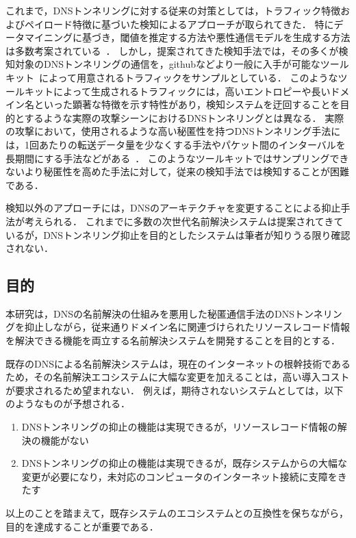 これまで，DNSトンネリングに対する従来の対策としては，トラフィック特徴およびペイロード特徴に基づいた検知によるアプローチが取られてきた．
特にデータマイニングに基づき，閾値を推定する方法や悪性通信モデルを生成する方法は多数考案されている~\cite{born, cheng, liu, asaf, steadman, jawad}．
しかし，提案されてきた検知手法では，その多くが検知対象のDNSトンネリングの通信を，githubなどより一般に入手が可能なツールキット~\cite{ozymandns, iodine, dnscat2}によって用意されるトラフィックをサンプルとしている．
このようなツールキットによって生成されるトラフィックには，高いエントロピーや長いドメイン名といった顕著な特徴を示す特性があり，検知システムを迂回することを目的とするような実際の攻撃シーンにおけるDNSトンネリングとは異なる．
実際の攻撃において，使用されるような高い秘匿性を持つDNSトンネリング手法には，1回あたりの転送データ量を少なくする手法やパケット間のインターバルを長期間にする手法などがある~\cite{asaf}．
このようなツールキットではサンプリングできないより秘匿性を高めた手法に対して，従来の検知手法では検知することが困難である．

検知以外のアプローチには，DNSのアーキテクチャを変更することによる抑止手法が考えられる．
これまでに多数の次世代名前解決システムは提案されてきているが，DNSトンネリング抑止を目的としたシステムは筆者が知りうる限り確認されない．


\subsection{目的}
本研究は，DNSの名前解決の仕組みを悪用した秘匿通信手法のDNSトンネリングを抑止しながら，従来通りドメイン名に関連づけられたリソースレコード情報を解決できる機能を両立する名前解決システムを開発することを目的とする．

既存のDNSによる名前解決システムは，現在のインターネットの根幹技術であるため，その名前解決エコシステムに大幅な変更を加えることは，高い導入コストが要求されるため望まれない．
例えば，期待されないシステムとしては，以下のようなものが予想される．
\begin{enumerate}
 \setlength{\itemsep}{-0.5mm}
 \item DNSトンネリングの抑止の機能は実現できるが，リソースレコード情報の解決の機能がない
 \item DNSトンネリングの抑止の機能は実現できるが，既存システムからの大幅な変更が必要になり，未対応のコンピュータのインターネット接続に支障をきたす
\end{enumerate}
以上のことを踏まえて，既存システムのエコシステムとの互換性を保ちながら，目的を達成することが重要である．

